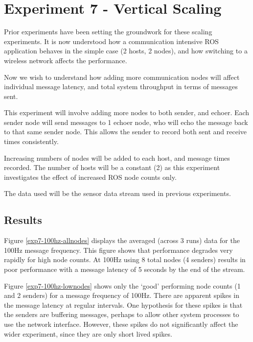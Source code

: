 \documentclass[../dissertation.tex]{subfiles}
\begin{document}
\section{Experiment 7 - Vertical Scaling}
\label{experiment7-vertical-scaling}

Prior experiments have been setting the groundwork for these scaling experiments. It is now understood how a communication intensive ROS application behaves in the simple case (2 hosts, 2 nodes), and how switching to a wireless network affects the performance.

Now we wish to understand how adding more communication nodes will affect individual message latency, and total system throughput in terms of messages sent.

This experiment will involve adding more nodes to both sender, and echoer. Each sender node will send messages to 1 echoer node, who will echo the message back to that same sender node. This allows the sender to record both sent and receive times consistently.

Increasing numbers of nodes will be added to each host, and message times recorded. The number of hosts will be a constant (2) as this experiment investigates the effect of increased ROS node counts only.

The data used will be the sensor data stream used in previous experiments.

\subsection{Results}

Figure \ref{exp7-100hz-allnodes} displays the averaged (across 3 runs) data for the 100Hz message frequency. This figure shows that performance degrades very rapidly for high node counts. At 100Hz using 8 total nodes (4 senders) results in poor performance with a message latency of 5 seconds by the end of the stream.

Figure \ref{exp7-100hz-lownodes} shows only the `good' performing node counts (1 and 2 senders) for a message frequency of 100Hz. There are apparent spikes in the message latency at regular intervals. One hypothesis for these spikes is that the senders are buffering messages, perhaps to allow other system processes to use the network interface. However, these spikes do not significantly affect the wider experiment, since they are only short lived spikes.
\end{document}
